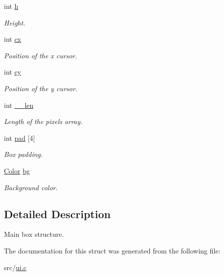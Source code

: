 \begin{DoxyCompactItemize}
$$int \hyperlink{struct__Ui__box_ab81930762400818df39bd6acc348d26f}{h}
\begin{DoxyCompactList}\small\item\em Height. \end{DoxyCompactList}\item 
\mbox{\label{struct__Ui__box_aa44d253872cfb9297e3fa71b93d9fc88}} 
int \hyperlink{struct__Ui__box_aa44d253872cfb9297e3fa71b93d9fc88}{cx}
\begin{DoxyCompactList}\small\item\em Position of the x cursor. \end{DoxyCompactList}\item 
\mbox{\label{struct__Ui__box_a993ecc3e3509632642cb403b731d9a6d}} 
int \hyperlink{struct__Ui__box_a993ecc3e3509632642cb403b731d9a6d}{cy}
\begin{DoxyCompactList}\small\item\em Position of the y cursor. \end{DoxyCompactList}\item 
\mbox{\label{struct__Ui__box_ade30a16b2e23d494a77767ce516f00d9}} 
int \hyperlink{struct__Ui__box_ade30a16b2e23d494a77767ce516f00d9}{\+\_\+\+\_\+len}
\begin{DoxyCompactList}\small\item\em Length of the pixels array. \end{DoxyCompactList}\item 
\mbox{\label{struct__Ui__box_a4030a2fd2487e5a4cde2b4fccc999166}} 
int \hyperlink{struct__Ui__box_a4030a2fd2487e5a4cde2b4fccc999166}{pad} \mbox{[}4\mbox{]}
\begin{DoxyCompactList}\small\item\em Box padding. \end{DoxyCompactList}\item 
\mbox{\label{struct__Ui__box_a2562527c18b6318ba537faae8dd2d06c}} 
\hyperlink{ui_8h_ab87bacfdad76e61b9412d7124be44c1c}{Color} \hyperlink{struct__Ui__box_a2562527c18b6318ba537faae8dd2d06c}{bg}
\begin{DoxyCompactList}\small\item\em Background color. \end{DoxyCompactList}\end{DoxyCompactItemize}


\subsection{Detailed Description}
Main box structure. 

The documentation for this struct was generated from the following file\+:\begin{DoxyCompactItemize}
\item 
src/\hyperlink{ui_8c}{ui.\+c}\end{DoxyCompactItemize}
